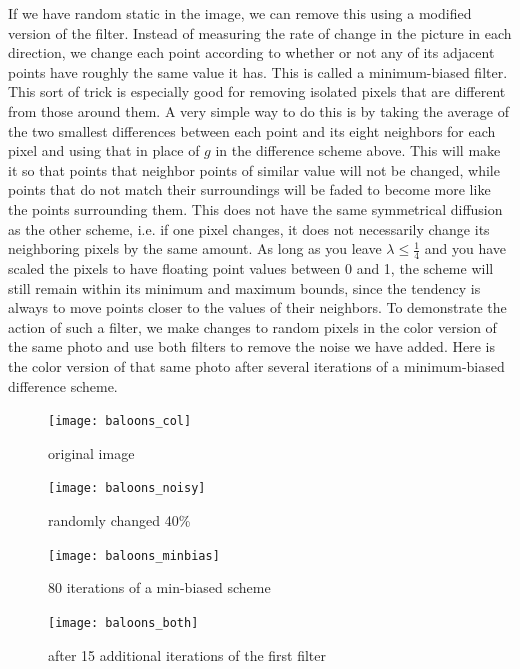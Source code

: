 If we have random static in the image, we can remove this using a modified version of the filter.
Instead of measuring the rate of change in the picture in each direction, we change each point according to whether or not any of its adjacent points have roughly the same value it has. 
This is called a minimum-biased filter. 
This sort of trick is especially good for removing isolated pixels that are different from those around them.
A very simple way to do this is by taking the average of the two smallest differences between each point and its eight neighbors for each pixel and using that in place of $g$ in the difference scheme above.
This will make it so that points that neighbor points of similar value will not be changed, while points that do not match their surroundings will be faded to become more like the points surrounding them.
This does not have the same symmetrical diffusion as the other scheme, i.e. if one pixel changes, it does not necessarily change its neighboring pixels by the same amount.
As long as you leave $\lambda \leq \frac{1}{4}$ and you have scaled the pixels to have floating point values between 0 and 1, the scheme will still remain within its minimum and maximum bounds, since the tendency is always to move points closer to the values of their neighbors.
To demonstrate the action of such a filter, we make changes to random pixels in the color version of the same photo and use both filters to remove the noise we have added.
Here is the color version of that same photo after several iterations of a minimum-biased difference scheme.

\newpage
\vfill
\begin{figure}[ht]
\begin{minipage}[b]{0.45\linewidth}
\centering
\texttt{[image: baloons\_col]}
\caption*{original image}
\end{minipage}
\hspace{0.5cm}
\begin{minipage}[b]{0.45\linewidth}
\centering
\texttt{[image: baloons\_noisy]}
\caption*{randomly changed 40\%}
\end{minipage}
\begin{minipage}[b]{0.45\linewidth}
\centering
\texttt{[image: baloons\_minbias]}
\caption*{80 iterations of a min-biased scheme}
\end{minipage}
\hspace{0.5cm}
\begin{minipage}[b]{0.45\linewidth}
\centering
\texttt{[image: baloons\_both]}
\caption*{after 15 additional iterations of the first filter}
\end{minipage}
\end{figure}
\vfill
\clearpage

